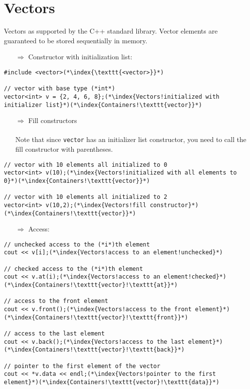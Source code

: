 \documentclass[10pt]{book}
\begin{document}
\section{Vectors}
Vectors as supported by the C++ standard library. Vector elements are guaranteed to be stored sequentially in memory.
\begin{enumerate}
\item[$\Rightarrow$] Constructor with initialization list:
\end{enumerate}
\begin{lstlisting}
#include <vector>(*\index{\texttt{<vector>}}*)

// vector with base type (*int*)
vector<int> v = {2, 4, 6, 8};(*\index{Vectors!initialized with initializer list}*)(*\index{Containers!\texttt{vector}}*)
\end{lstlisting}
\begin{enumerate}
\item[$\Rightarrow$] Fill constructors\\ \\ Note that since \texttt{vector} has an initializer list constructor, you need to call the fill constructor with parentheses.
\end{enumerate}
\begin{lstlisting}
// vector with 10 elements all initialized to 0
vector<int> v(10);(*\index{Vectors!initialized with all elements to 0}*)(*\index{Containers!\texttt{vector}}*)

// vector with 10 elements all initialized to 2
vector<int> v(10,2);(*\index{Vectors!fill constructor}*)(*\index{Containers!\texttt{vector}}*)
\end{lstlisting}
\begin{enumerate}
\item[$\Rightarrow$] Access:
\end{enumerate}
\begin{lstlisting}
// unchecked access to the (*i*)th element
cout << v[i];(*\index{Vectors!access to an element!unchecked}*)

// checked access to the (*i*)th element
cout << v.at(i);(*\index{Vectors!access to an element!checked}*)(*\index{Containers!\texttt{vector}!\texttt{at}}*)

// access to the front element
cout << v.front();(*\index{Vectors!access to the front element}*)(*\index{Containers!\texttt{vector}!\texttt{front}}*)

// access to the last element
cout << v.back();(*\index{Vectors!access to the last element}*)(*\index{Containers!\texttt{vector}!\texttt{back}}*)

// pointer to the first element of the vector
cout << *v.data << endl;(*\index{Vectors!pointer to the first element}*)(*\index{Containers!\texttt{vector}!\texttt{data}}*)
\end{lstlisting}
\end{document}
